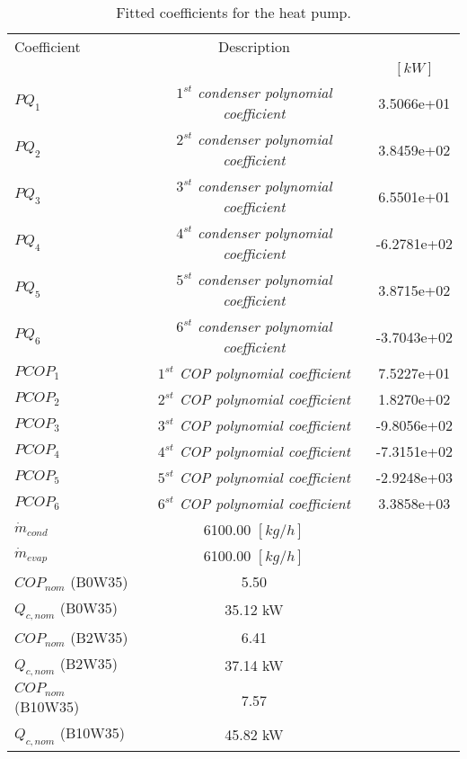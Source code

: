 \documentclass[english]{SPFShortReport}
\author{Dani Carbonell}
\begin{document}
\begin{table}[!ht]
\begin{small}
\caption{Fitted coefficients for the heat pump.}
\begin{center}
\resizebox{12cm}{!} 
{
\begin{tabular}{l | c c } 
\hline
\hline
Coefficient &Description & \\ 
 & &$[kW]$\\ 
\hline
$PQ_{1}$ & \emph{$1^{st}$ condenser polynomial coefficient}  & 3.5066e+01    \\ 
$PQ_{2}$ & \emph{$2^{st}$ condenser polynomial coefficient}  & 3.8459e+02    \\ 
$PQ_{3}$ & \emph{$3^{st}$ condenser polynomial coefficient}  & 6.5501e+01    \\ 
$PQ_{4}$ & \emph{$4^{st}$ condenser polynomial coefficient}  & -6.2781e+02    \\ 
$PQ_{5}$ & \emph{$5^{st}$ condenser polynomial coefficient}  & 3.8715e+02    \\ 
$PQ_{6}$ & \emph{$6^{st}$ condenser polynomial coefficient}  & -3.7043e+02    \\ 
\hline
$PCOP_{1}$ & \emph{$1^{st}$ COP polynomial coefficient}  & 7.5227e+01    \\ 
$PCOP_{2}$ & \emph{$2^{st}$ COP polynomial coefficient}  & 1.8270e+02    \\ 
$PCOP_{3}$ & \emph{$3^{st}$ COP polynomial coefficient}  & -9.8056e+02    \\ 
$PCOP_{4}$ & \emph{$4^{st}$ COP polynomial coefficient}  & -7.3151e+02    \\ 
$PCOP_{5}$ & \emph{$5^{st}$ COP polynomial coefficient}  & -2.9248e+03    \\ 
$PCOP_{6}$ & \emph{$6^{st}$ COP polynomial coefficient}  & 3.3858e+03    \\ 
\hline
$\dot m_{cond}$ & 6100.00 $[kg/h]$\\ 
$\dot m_{evap}$ & 6100.00 $[kg/h]$\\ 
\hline
$COP_{nom}$ (B0W35)& 5.50 \\ 
$Q_{c,nom}$ (B0W35)& 35.12 kW\\ 
$COP_{nom}$ (B2W35)& 6.41 \\ 
$Q_{c,nom}$ (B2W35)& 37.14 kW\\ 
$COP_{nom}$ (B10W35)& 7.57 \\ 
$Q_{c,nom}$ (B10W35)& 45.82 kW\\ 
\hline
\hline
\end{tabular}
}
\label{CoefTable}
\end{center}
\end{small}
\end{table}
\end{document}
